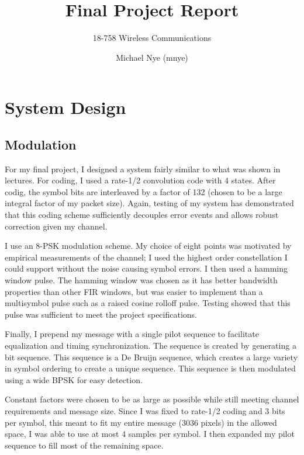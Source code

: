 \documentclass[11pt]{scrartcl}
\begin{document}
\title{Final Project Report}
\subtitle{18-758 Wireless Communications}
\author{Michael Nye (mnye)}
\date{}
\maketitle



\section*{System Design}

\subsection*{Modulation}

For my final project, I designed a system fairly similar to what was shown in
lectures. For coding, I used a rate-1/2 convolution code with 4 states. After
codig, the symbol bits are interleaved by a factor of 132 (chosen to be a large
integral factor of my packet size). Again, testing of my system has demonstrated
that this coding scheme sufficiently decouples error events and allows robust
correction given my channel.

I use an 8-PSK modulation scheme. My choice of eight points was motivated by
empirical measurements of the channel; I used the highest order constellation
I could support without the noise causing symbol errors. I then used a hamming
window pulse. The hamming window was chosen as it has better bandwidth
properties than other FIR windows, but was easier to implement than
a multisymbol pulse such as a raised cosine rolloff pulse. Testing showed that
this pulse was sufficient to meet the project specifications.

Finally, I prepend my message with a single pilot sequence to facilitate
equalization and timing synchronization. The sequence is created by generating
a bit sequence. This sequence is a De Bruijn sequence, which creates a large
variety in symbol ordering to create a unique sequence. This sequence is then
modulated using a wide BPSK for easy detection.

Constant factors were chosen to be as large as possible while still meeting
channel requirements and message size. Since I was fixed to rate-1/2 coding and
3 bits per symbol, this meant to fit my entire message (3036 pixels) in the
allowed space, I was able to use at most 4 samples per symbol. I then expanded
my pilot sequence to fill most of the remaining space.
\end{document}
